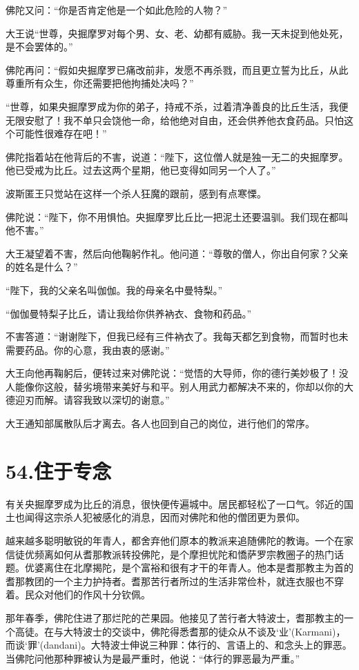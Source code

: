 \documentclass[12pt,twoside,openany]{book}
\begin{document}
佛陀又问：“你是否肯定他是一个如此危险的人物？”

大王说“世尊，央掘摩罗对每个男、女、老、幼都有威胁。我一天未捉到他处死，是不会罢体的。”

佛陀再问：“假如央掘摩罗已痛改前非，发愿不再杀戮，而且更立誓为比丘，从此尊重所有众生，你还需要把他拘捕处决吗？”

“世尊，如果央掘摩罗成为你的弟子，持戒不杀，过着清净善良的比丘生活，我便无限安慰了！我不单只会饶他一命，给他绝对自由，还会供养他衣食药品。只怕这个可能性很难存在吧！”

佛陀指着站在他背后的不害，说道：“陛下，这位僧人就是独一无二的央掘摩罗。他已受戒为比丘。过去这两个星期，他已变得如同另一个人了。”

波斯匿王只觉站在这样一个杀人狂魔的跟前，感到有点寒慄。

佛陀说：“陛下，你不用惧怕。央掘摩罗比丘比一把泥土还要温驯。我们现在都叫他不害。”

大王凝望着不害，然后向他鞠躬作礼。他问道：“尊敬的僧人，你出自何家？父亲的姓名是什么？”

“陛下，我的父亲名叫伽伽。我的母亲名中曼特梨。”

“伽伽曼特梨子比丘，请让我给你供养衲衣、食物和药品。”

不害答道：“谢谢陛下，但我已经有三件衲衣了。我每天都乞到食物，而暂时也未需要药品。你的心意，我由衷的感谢。”

大王向他再鞠躬后，便转过来对佛陀说：“觉悟的大导师，你的德行美妙极了！没人能像你这般，替劣境带来美好与和平。别人用武力都解决不来的，你却以你的大德迎刃而解。请容我致以深切的谢意。”

大王通知部属散队后才离去。各人也回到自己的岗位，进行他们的常序。


\chapter{54.住于专念}\label{ch54}

有关央掘摩罗成为比丘的消息，很快便传遍城中。居民都轻松了一口气。邻近的国土也闻得这宗杀人犯被感化的消息，因而对佛陀和他的僧团更为景仰。

越来越多聪明敏锐的年青人，都舍弃他们原本的教派来追随佛陀的教诲。一个在家信徒优频离如何从耆那教派转投佛陀，是个摩担忧陀和憍萨罗宗教圈子的热门话题。优婆离住在北摩揭陀，是个富裕和很有才干的年青人。他本是耆那教主为首的耆那教团的一个主力护持者。耆那苦行者所过的生活非常俭朴，就连衣服也不穿着。民众对他们的作风十分钦佩。

那年春季，佛陀住进了那烂陀的芒果园。他接见了苦行者大特波士，耆那教主的一个高徒。在与大特波士的交谈中，佛陀得悉耆那的徒众从不谈及‘业’(Karmani)，而谈‘罪’(dandani)。大特波士伸说三种罪：体行的、言语上的、和念头上的罪恶。当佛陀问他那种罪被认为是最严重时，他说：“体行的罪恶最为严重。”
\end{document}
